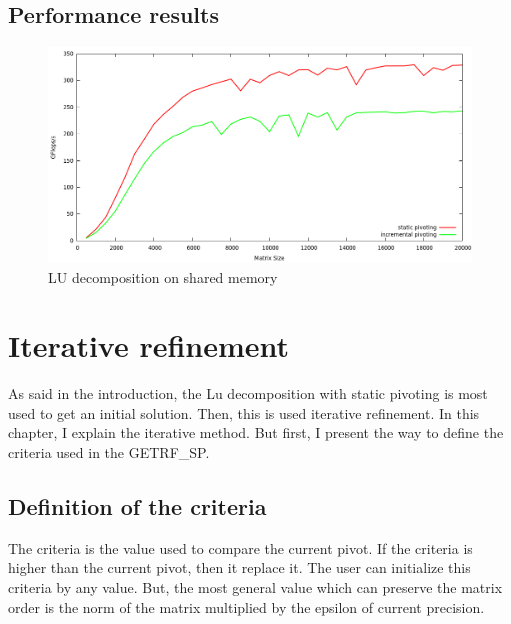 \documentclass{report}
\begin{document}
\section{Performance results}

\begin{figure}[!h]
\begin{center}
\includegraphics[width=\textwidth]{dgetrf_dague_remus.png} 
\end{center}
\caption{LU decomposition on shared memory}
\end{figure}

\chapter{Iterative refinement}
As said in the introduction, the Lu decomposition with static pivoting is most used to get an initial solution. Then, this is used iterative refinement. In this chapter, I explain the iterative method. But first, I present the way to define the criteria used in the GETRF\_SP.

\section{Definition of the criteria}
The criteria is the value used to compare the current pivot. If the criteria is higher than the current pivot, then it replace it. The user can initialize this criteria by any value. But, the most general value which can preserve the matrix order is the norm of the matrix multiplied by the epsilon of current precision.
\end{document}
